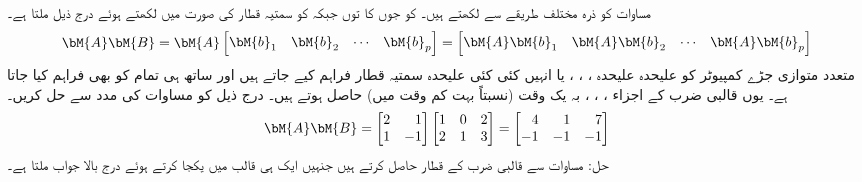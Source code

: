 مساوات  کو ذرہ مختلف طریقے سے لکھتے ہیں۔ کو جوں کا توں جبکہ  کو سمتیہ قطار کی صورت میں  لکھتے ہوئے درج ذیل ملتا ہے۔
\begin{align}\label{مساوات_الجبرا_ضرب_بذریعہ_کمپیوٹر}
\bM{A}\bM{B}=\bM{A}
\begin{bmatrix}
\bM{b}_1 & \bM{b}_2 & \cdots & \bM{b}_p
\end{bmatrix}=
\begin{bmatrix}
\bM{A}\bM{b}_1 &\bM{A} \bM{b}_2 & \cdots & \bM{A}\bM{b}_p
\end{bmatrix}
\end{align}
متعدد متوازی جڑے کمپیوٹر کو علیحدہ علیحدہ ، ، ،   یا انہیں کئی کئی علیحدہ سمتیہ قطار فراہم کیے جاتے ہیں اور ساتھ ہی تمام کو  بھی فراہم کیا جاتا ہے۔ یوں قالبی ضرب کے اجزاء ، ، ،  بہ یک وقت (نسبتاً بہت کم وقت میں) حاصل ہوتے ہیں۔
درج ذیل کو مساوات  کی مدد سے حل کریں۔
\begin{align*}
\bM{A}\bM{B}=
\begin{bmatrix*}[r]
2&1\\
1&-1
\end{bmatrix*}
\begin{bmatrix*}[r]
1&0&2\\
2&1&3
\end{bmatrix*}=
\begin{bmatrix*}[r]
4&1&7\\
-1&-1&-1
\end{bmatrix*}
\end{align*}
حل: مساوات  سے قالبی ضرب کے قطار حاصل کرتے ہیں جنہیں ایک ہی قالب میں یکجا کرتے ہوئے درج بالا جواب ملتا ہے۔
